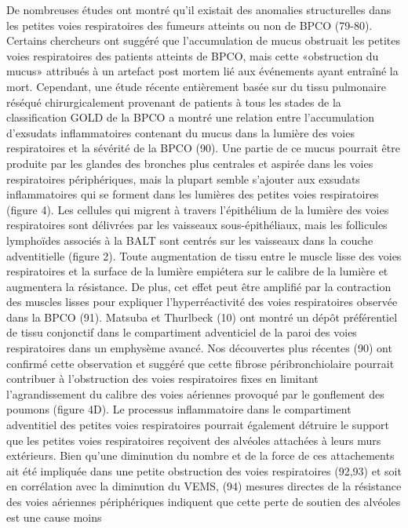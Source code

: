 \documentclass[12pt,]{article}
\begin{document}
De nombreuses études ont montré qu'il existait des anomalies
structurelles dans les petites voies respiratoires des fumeurs atteints
ou non de BPCO (79-80). Certains chercheurs ont suggéré que
l'accumulation de mucus obstruait les petites voies respiratoires des
patients atteints de BPCO, mais cette «obstruction du mucus» attribués à
un artefact post mortem lié aux événements ayant entraîné la mort.
Cependant, une étude récente entièrement basée sur du tissu pulmonaire
réséqué chirurgicalement provenant de patients à tous les stades de la
classification GOLD de la BPCO a montré une relation entre
l'accumulation d'exsudats inflammatoires contenant du mucus dans la
lumière des voies respiratoires et la sévérité de la BPCO (90). Une
partie de ce mucus pourrait être produite par les glandes des bronches
plus centrales et aspirée dans les voies respiratoires périphériques,
mais la plupart semble s'ajouter aux exsudats inflammatoires qui se
forment dans les lumières des petites voies respiratoires (figure 4).
Les cellules qui migrent à travers l'épithélium de la lumière des voies
respiratoires sont délivrées par les vaisseaux sous-épithéliaux, mais
les follicules lymphoïdes associés à la BALT sont centrés sur les
vaisseaux dans la couche adventitielle (figure 2). Toute augmentation de
tissu entre le muscle lisse des voies respiratoires et la surface de la
lumière empiétera sur le calibre de la lumière et augmentera la
résistance. De plus, cet effet peut être amplifié par la contraction des
muscles lisses pour expliquer l'hyperréactivité des voies respiratoires
observée dans la BPCO (91). Matsuba et Thurlbeck (10) ont montré un
dépôt préférentiel de tissu conjonctif dans le compartiment adventiciel
de la paroi des voies respiratoires dans un emphysème avancé. Nos
découvertes plus récentes (90) ont confirmé cette observation et suggéré
que cette fibrose péribronchiolaire pourrait contribuer à l'obstruction
des voies respiratoires fixes en limitant l'agrandissement du calibre
des voies aériennes provoqué par le gonflement des poumons (figure 4D).
Le processus inflammatoire dans le compartiment adventitiel des petites
voies respiratoires pourrait également détruire le support que les
petites voies respiratoires reçoivent des alvéoles attachées à leurs
murs extérieurs. Bien qu'une diminution du nombre et de la force de ces
attachements ait été impliquée dans une petite obstruction des voies
respiratoires (92,93) et soit en corrélation avec la diminution du VEMS,
(94) mesures directes de la résistance des voies aériennes périphériques
indiquent que cette perte de soutien des alvéoles est une cause moins
\end{document}
